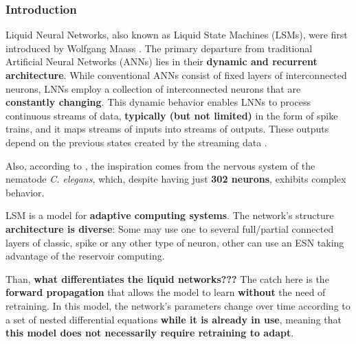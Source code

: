 \begin{frame}[allowframebreaks]
	\frametitle{Introduction}
	\par Liquid Neural Networks, also known as Liquid State Machines (LSMs), were first introduced by Wolfgang Maass \cite{6789852}. The primary departure from traditional Artificial Neural Networks (ANNs) lies in their \textbf{dynamic and recurrent architecture}. While conventional ANNs consist of fixed layers of interconnected neurons, LNNs employ a  collection of interconnected neurons that are \textbf{constantly changing}. This dynamic behavior enables LNNs to process continuous streams of data, \textbf{typically (but not limited)} in the form of spike trains, and it maps streams of inputs into streams of outputs. These outputs depend on the previous states created by the streaming data \cite{doi:10.1142/9781848162778_0008}.\newline
	
	\par Also, according to \cite{hasani2020liquid}, the inspiration comes from the nervous system of the nematode \textit{C. elegans}, which, despite having just \textbf{302 neurons}, exhibits complex behavior. \newline
	
	\par LSM is a model for \textbf{adaptive computing systems}. The network's structure \textbf{architecture is diverse}: Some may use one to several full/partial connected layers of classic, spike or any other type of neuron, other can use an ESN taking advantage of the reservoir computing.\newline
	
	\par Than, \textbf{what differentiates the liquid networks???} The catch here is the \textbf{forward propagation} that allows the model to learn \textbf{without} the need of retraining. In this model, the network's parameters change over time according to a set of nested differential equations \textbf{while it is already in use}, meaning that \textbf{this model does not necessarily require retraining to adapt}.\newline
	

\end{frame}
